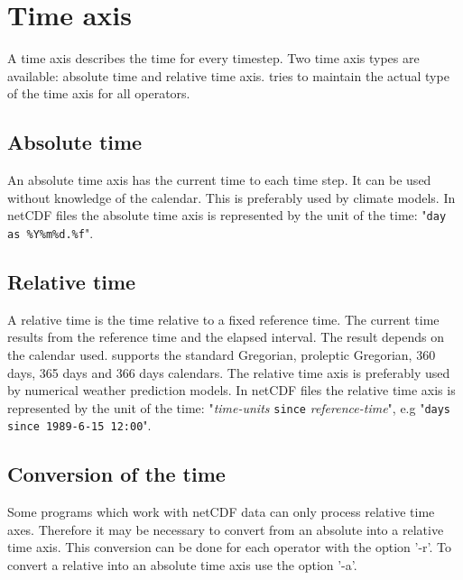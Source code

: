 \section{Time axis}

A time axis describes the time for every timestep.
Two time axis types are available: absolute time and relative time axis.
{\CDO} tries to maintain the actual type of the time axis for all operators.

\subsection{Absolute time}

An absolute time axis has the current time to each time step.
It can be used without knowledge of the calendar.
This is preferably used by climate models.
In netCDF files the absolute time axis is represented by the 
unit of the time: {"{\tt day as \%Y\%m\%d.\%f}"}.

\subsection{Relative time}

A relative time is the time relative to a fixed reference time.
The current time results from the reference time and the elapsed interval.
The result depends on the calendar used.
{\CDO} supports the standard Gregorian, proleptic Gregorian, 360 days, 365 days and 366 days calendars.
The relative time axis is preferably used by numerical weather prediction models.
In netCDF files the relative time axis is represented by the 
unit of the time: {"{\it time-units} {\tt since} {\it reference-time}"},
e.g "{\tt days since 1989-6-15 12:00}".

\subsection{Conversion of the time}

Some programs which work with netCDF data can only process relative time axes.
Therefore it may be necessary to convert from an absolute into a relative time axis.
This conversion can be done for each operator with the {\CDO} option '-r'.
To convert a relative into an absolute time axis use the {\CDO} option '-a'.
